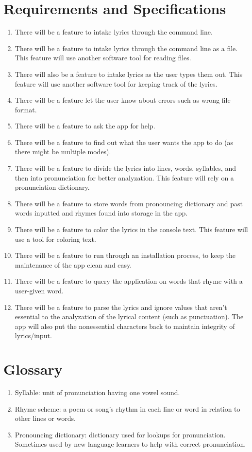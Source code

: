 \documentclass[12pt,a4paper]{report}
\begin{document}
\section{Requirements and Specifications}
\begin{enumerate}
    \item There will be a feature to intake lyrics through the command line.
    \item There will be a feature to intake lyrics through the command line as a file. This feature will use another software tool for reading files.
    \item There will also be a feature to intake lyrics as the user types them out. This feature will use another software tool for keeping track of the lyrics.
    \item There will be a feature let the user know about errors such as wrong file format.
    \item There will be a feature to ask the app for help.
    \item There will be a feature to find out what the user wants the app to do (as there might be multiple modes).
    \item There will be a feature to divide the lyrics into lines, words, syllables, and then into pronunciation for better analyzation. This feature will rely on a pronunciation dictionary.
    \item There will be a feature to store words from pronouncing dictionary and past words inputted and rhymes found into storage in the app.
    \item There will be a feature to color the lyrics in the console text. This feature will use a tool for coloring text.
    \item There will be a feature to run through an installation process, to keep the maintenance of the app clean and easy.
    \item There will be a feature to query the application on words that rhyme with a user-given word.
    \item There will be a feature to parse the lyrics and ignore values that aren't essential to the analyzation of the lyrical content (such as punctuation). The app will also put the nonessential characters back to maintain integrity of lyrics/input.
\end{enumerate}
\section{Glossary}
\begin{enumerate}
    \item Syllable: unit of pronunciation having one vowel sound.
    \item Rhyme scheme: a poem or song's rhythm in each line or word in relation to other lines or words.
    \item Pronouncing dictionary: dictionary used for lookups for pronunciation. Sometimes used by new language learners to help with correct pronunciation.
\end{enumerate}
\end{document}
